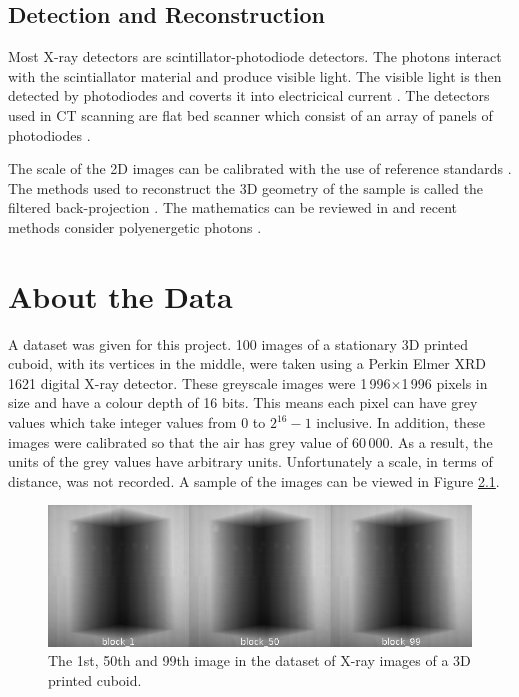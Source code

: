 \documentclass[12pt]{report}
\begin{document}
\section{Detection and Reconstruction}
Most X-ray detectors are scintillator-photodiode detectors. The photons interact with the scintiallator material and produce visible light. The visible light is then detected by photodiodes and coverts it into electricical current \cite{michael2001x}. The detectors used in CT scanning are flat bed scanner which consist of an array of panels of photodiodes \cite{cantatore2011introduction}.

The scale of the 2D images can be calibrated with the use of reference standards \cite{bartscher2007enhancement}. The methods used to reconstruct the 3D geometry of the sample is called the filtered back-projection \cite{michael2001x}. The mathematics can be reviewed in \cite{brooks1976principles} and recent methods consider polyenergetic photons \cite{elbakri2002statistical}.


\chapter{About the Data}\label{chapter:about_the_data}

A dataset was given for this project. 100 images of a stationary 3D printed cuboid, with its vertices in the middle, were taken using a Perkin Elmer XRD 1621 digital X-ray detector. These greyscale images were 1\,996$\times$1\,996 pixels in size and have a colour depth of 16 bits. This means each pixel can have grey values which take integer values from 0 to $2^{16}-1$ inclusive. In addition, these images were calibrated so that the air has grey value of 60\,000. As a result, the units of the grey values have arbitrary units. Unfortunately a scale, in terms of distance, was not recorded. A sample of the images can be viewed in Figure \ref{fig:block_montage}.

\begin{figure}[htp]
\centering
\includegraphics[width=1\textwidth]{figures/block_montage.jpg}
\caption{The 1st, 50th and 99th image in the dataset of X-ray images of a 3D printed cuboid.} 
\label{fig:block_montage}
\end{figure}
\end{document}
